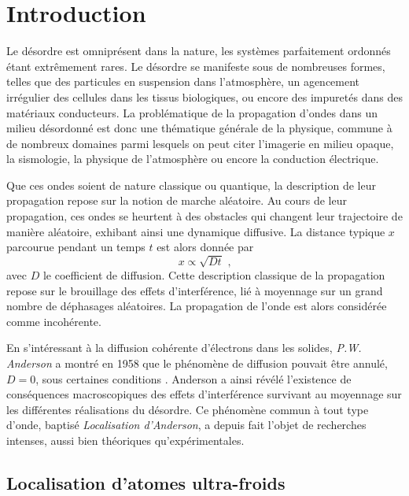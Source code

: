 
\chapter{Introduction}

Le désordre est omniprésent dans la nature, les systèmes parfaitement ordonnés étant extrêmement rares. Le désordre se manifeste sous de nombreuses formes, telles que des particules en suspension dans l'atmosphère, un agencement irrégulier des cellules dans les tissus biologiques, ou encore des impuretés dans des matériaux conducteurs. La problématique de la propagation d'ondes dans un milieu désordonné est donc une thématique générale de la physique, commune à de nombreux domaines parmi lesquels on peut citer l'imagerie en milieu opaque, la sismologie, la physique de l'atmosphère ou encore la conduction électrique. 

Que ces ondes soient de nature classique ou quantique, la description de leur propagation repose sur la notion de marche aléatoire. Au cours de leur propagation, ces ondes se heurtent à des obstacles qui changent leur trajectoire de manière aléatoire, exhibant ainsi une dynamique diffusive. La distance typique $x$ parcourue pendant un temps $t$ est alors donnée par
\begin{equation}
x\propto\sqrt{Dt} \text{ ,}
\end{equation}
avec $D$ le coefficient de diffusion. Cette description classique de la propagation repose sur le brouillage des effets d'interférence, lié à moyennage sur un grand nombre de déphasages aléatoires. La propagation de l'onde est alors considérée comme incohérente.

En s'intéressant à la diffusion cohérente d'électrons dans les solides, \emph{P.W. Anderson} a montré en 1958 que le phénomène de diffusion pouvait être annulé, $D=0$, sous certaines conditions \citep{anderson1958absence}. Anderson a ainsi révélé l'existence de conséquences macroscopiques des effets d'interférence survivant au moyennage sur les différentes réalisations du désordre. Ce phénomène commun à tout type d'onde, baptisé \emph{Localisation d'Anderson}, a depuis fait l'objet de recherches intenses, aussi bien théoriques qu'expérimentales. 


\section{Localisation d'atomes ultra-froids}

